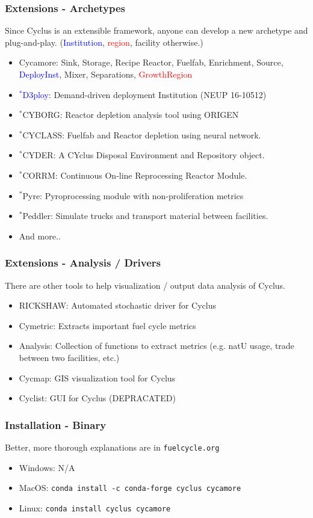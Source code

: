 \begin{frame}
	\frametitle{Extensions - Archetypes}
	Since Cyclus is an extensible framework, anyone can develop a new archetype and plug-and-play. (\textcolor{blue}{Institution}, \textcolor{red}{region}, facility otherwise.)
	\begin{itemize}
		\item Cycamore: Sink, Storage, Recipe Reactor, Fuelfab, Enrichment, Source, \textcolor{blue}{DeployInst}, Mixer, Separations, \textcolor{red}{GrowthRegion}
		\item \textcolor{blue}{$^*$D3ploy}: Demand-driven deployment Institution (NEUP 16-10512)
		\item $^*$CYBORG: Reactor depletion analysis tool using ORIGEN
		\item $^*$CYCLASS: Fuelfab and Reactor depletion using neural network.
		\item $^*$CYDER: A CYclus Disposal Environment and Repository object.
		\item $^*$CORRM: Continuous On-line Reprocessing Reactor Module.
		\item $^*$Pyre: Pyroprocessing module with non-proliferation metrics
        \item $^*$Peddler: Simulate trucks and transport material between facilities.
		\item And more..
	\end{itemize}

\end{frame}

\begin{frame}
	\frametitle{Extensions - Analysis / Drivers}
	There are other tools to help visualization / output data analysis of Cyclus.
	\begin{itemize}
		\item RICKSHAW: Automated stochastic driver for Cyclus
		\item Cymetric: Extracts important fuel cycle metrics
		\item Analysis: Collection of functions to extract metrics (e.g. natU usage, trade between two facilities, etc.)
		\item Cycmap: GIS visualization tool for Cyclus
		\item Cyclist: GUI for Cyclus (DEPRACATED)
	\end{itemize}
\end{frame}


\begin{frame}
	\frametitle{Installation - Binary}
	Better, more thorough explanations are in \texttt{fuelcycle.org}
	\begin{itemize}
		\item Windows: N/A
		\item MacOS: \texttt{conda install -c conda-forge cyclus cycamore}
		\item Linux: \texttt{conda install cyclus cycamore}
	\end{itemize}
\end{frame}


